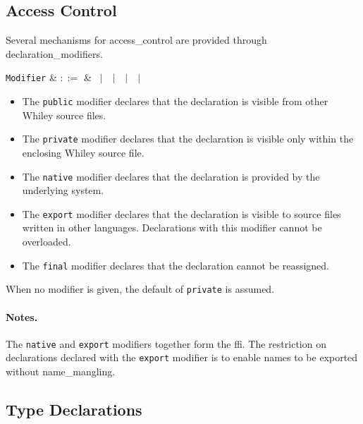 \subsection{Access Control}

Several mechanisms for \gls{access_control} are provided through \glspl{declaration_modifier}.

\begin{syntax}
\verb+Modifier+ & $::=$ & \ $|$\ \ $|$\ \ $|$\ \ $|$\ \\
\end{syntax}

\begin{itemize}
\item The \lstinline{public} modifier declares that the \gls{declaration} is visible from other Whiley source files.
\item The \lstinline{private} modifier declares that the \gls{declaration} is visible only within the enclosing Whiley source file.
\item The \lstinline{native} modifier declares that the \gls{declaration} is provided by the underlying system.
\item The \lstinline{export} modifier declares that the \gls{declaration} is visible to source files written in other languages.  Declarations with this modifier cannot be overloaded.
\item The \lstinline{final} modifier declares that the \gls{declaration} cannot be reassigned.
\end{itemize}

\noindent When no modifier is given, the default of \lstinline{private} is assumed.  

\paragraph{Notes.} The \lstinline{native} and \lstinline{export} modifiers together form the \gls{ffi}.  The restriction on declarations declared with the \lstinline{export} modifier is to enable names to be exported without \gls{name_mangling}.


\subsection{Type Declarations}
\label{c_source_files_type_decl}

